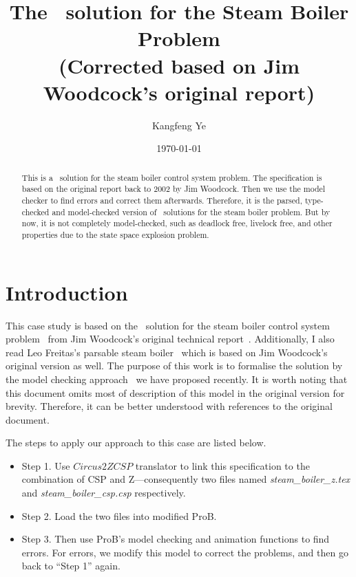 \documentclass{report} %
\begin{document}


\title{The \Circus\ solution for the Steam Boiler Problem \\ (Corrected based on Jim Woodcock's original report)}
\author{Kangfeng Ye}
\date{\today}

\maketitle

\begin{abstract}
   \noindent This is a \Circus\ solution for the steam boiler control system problem. The specification is based on the original report back to 2002 by Jim Woodcock. Then we use the model checker to find errors and correct them afterwards. Therefore, it is the parsed, type-checked and model-checked version of \Circus\ solutions for the steam boiler problem. But by now, it is not completely model-checked, such as deadlock free, livelock free, and other properties due to the state space explosion problem.
\end{abstract}

\newpage %

\tableofcontents %

\newpage %
\chapter{Introduction}

This case study is based on the \Circus\ solution for the steam boiler control system problem~\cite{Abrial1995} from Jim Woodcock's original technical report~\cite{Woodcock2001a}. Additionally, I also read Leo Freitas's parsable steam boiler~\cite{Freitas2006} which is based on Jim Woodcock's original version as well. The purpose of this work is to formalise the solution by the model checking approach~\cite{Ye2015} we have proposed recently. It is worth noting that this document omits most of description of this model in the original version for brevity. Therefore, it can be better understood with references to the original document.

The steps to apply our approach to this case are listed below.
\begin{itemize}
    \item Step 1. Use $Circus2ZCSP$ translator to link this specification to the combination of CSP and Z---consequently two files named \emph{steam\_boiler\_z.tex} and \emph{steam\_boiler\_csp.csp} respectively.
    \item Step 2. Load the two files into modified ProB.
    \item Step 3. Then use ProB's model checking and animation functions to find errors. For errors, we modify this model to correct the problems, and then go back to ``Step 1'' again.
\end{itemize}
\end{document}
